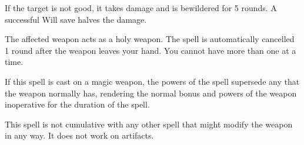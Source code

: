 \spellrng{\rngmed}
\begin{spelleffect}
  If the target is not good, it takes damage and is bewildered for 5 rounds. A successful Will save halves the damage.
\end{spelleffect}

\spellrng{\rngtouch}
\spelldur{\durmed}
\begin{spelleffect}
  The affected weapon acts as a  holy weapon. The spell is automatically cancelled 1 round after the weapon leaves your hand. You cannot have more than one  at a time.
  \par If this spell is cast on a magic weapon, the powers of the spell supersede any that the weapon normally has, rendering the normal bonus and powers of the weapon inoperative for the duration of the spell.
\end{spelleffect}
\begin{spellnotes}
  This spell is not cumulative with any other spell that might modify the weapon in any way. It does not work on artifacts.
\end{spellnotes}

